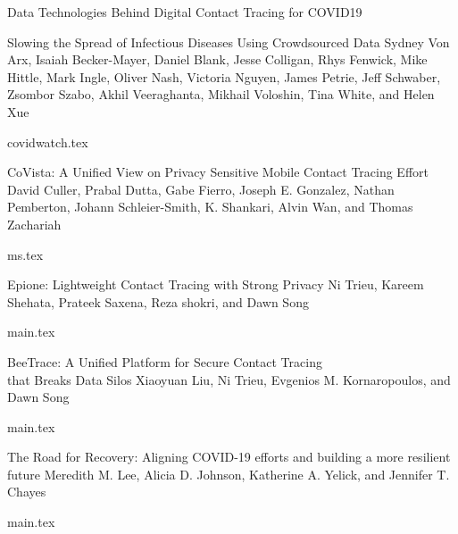 \documentclass[11pt]{article}
\begin{document}
\begin{bulletin}
\begin{articlesection}{Data Technologies Behind Digital Contact Tracing for COVID19}
\begin{article}
{Slowing the Spread of Infectious Diseases Using Crowdsourced Data}
{Sydney Von Arx, Isaiah Becker-Mayer, Daniel Blank, Jesse Colligan, Rhys Fenwick, Mike Hittle, Mark Ingle, Oliver Nash, Victoria Nguyen, James Petrie, Jeff Schwaber, Zsombor Szabo, Akhil Veeraghanta, Mikhail Voloshin, Tina White, and Helen Xue}
\graphicspath{{submissions/covidwatch/}}
{covidwatch.tex}
\end{article}


\begin{article}
{CoVista: A Unified View on Privacy Sensitive Mobile Contact Tracing Effort}
{David Culler, Prabal Dutta, Gabe Fierro, Joseph E. Gonzalez, Nathan Pemberton, Johann Schleier-Smith, K. Shankari, Alvin Wan, and Thomas Zachariah}
\graphicspath{{submissions/BerkeleyCovista/figs/}}
{ms.tex}
\end{article}

\begin{article}
{Epione: Lightweight  Contact Tracing with Strong Privacy}
{Ni Trieu, Kareem Shehata, Prateek Saxena, Reza shokri, and Dawn Song}
\graphicspath{{submissions/Epione_TCDE/figs/}}
{main.tex}
\end{article}


\begin{article}
{BeeTrace: A Unified Platform for Secure Contact Tracing\\ that Breaks Data Silos}
{Xiaoyuan Liu, Ni Trieu, Evgenios M. Kornaropoulos, and Dawn Song}
\graphicspath{{submissions/BeeTrace/figs/}}
{main.tex}
\end{article}




\begin{article}
{The Road for Recovery: 
Aligning COVID-19 efforts and building a more resilient future}
{Meredith M. Lee, Alicia D. Johnson, Katherine A. Yelick, and Jennifer T. Chayes}
\graphicspath{{submissions/OpEd_June2020_IEEEDataEng/figs/}}
{main.tex}
\end{article}





\end{articlesection}
\end{bulletin}
\end{document}
